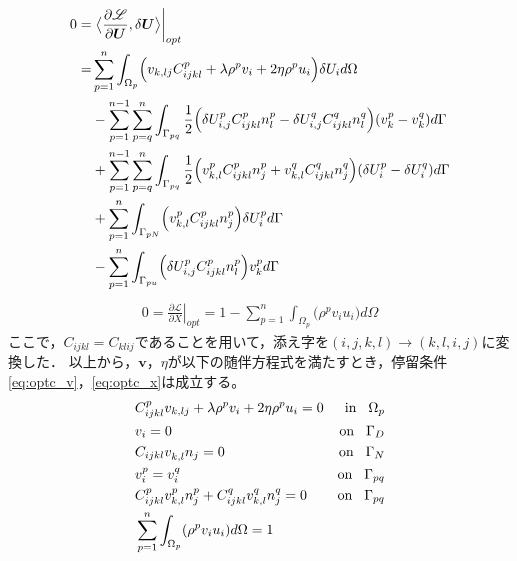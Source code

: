 \begin{align}
	0=&\left.\bigr\langle \frac{\partial \mathscr{L}}{\partial \bm{U}},\delta \bm{U} \bigl\rangle\right|_{opt}
	\nonumber
	\\
	=&\sum_{p=1}^{n}\int_{\Omega_p}\Bigr(v_{k,lj}C_{ijkl}^{p}+\lambda\rho^{p}v_{i}+2\eta\rho^{p}u_{i}\Bigl)\delta U_{i} d\Omega
	\nonumber
	\\
	&-\sum_{p=1}^{n-1}\sum_{p=q}^{n}\int_{\Gamma_{pq}}\frac{1}{2}\Bigr(\delta U_{i,j}^{p}C_{ijkl}^{p}n_{l}^{p}-\delta U_{i,j}^{q}C_{ijkl}^{q}n_{l}^{q}\Bigl)(v_{k}^{p}-v_{k}^{q}) d\Gamma
	\nonumber
	\\
	&+\sum_{p=1}^{n-1}\sum_{p=q}^{n}\int_{\Gamma_{pq}}\frac{1}{2}\Bigr(v_{k,l}^{p}C_{ijkl}^{p}n_{j}^{p}+v_{k,l}^{q}C_{ijkl}^{q}n_{j}^{q}\Bigl)(\delta U_{i}^{p}-\delta U_{i}^{q})d\Gamma
	\nonumber
	\\
	&+\sum_{p=1}^{n}\int_{\Gamma_{pN}}\Bigr(v_{k,l}^{p}C_{ijkl}^{p}n_{j}^{p}\Bigl)\delta U_{i}^{p} d\Gamma
	\nonumber
	\\
	&-\sum_{p=1}^{n}\int_{\Gamma_{pu}}\Bigr(\delta U_{i,j}^{p}C_{ijkl}^{p}n_{l}^{p}\Bigl)v_{k}^{p} d\Gamma
	\label{eq:lagrange_vderivative}
\end{align}
\begin{align}
	0=\left.\frac{\partial\mathscr{L}}{\partial X}\right|_{opt}
	=1-\sum_{p=1}^{n}\int_{\Omega_p}\bigr(\rho^{p}v_{i}u_{i}\bigl) d\Omega
	\label{eq:lagrange_xderivative}
\end{align}
ここで，$C_{ijkl}=C_{klij}$であることを用いて，添え字を$(i,j,k,l)\rightarrow(k,l,i,j)$に変換した．
以上から，$\bm{v}$，$\eta$が以下の随伴方程式を満たすとき，停留条件\eqref{eq:optc_v}，\eqref{eq:optc_x}は成立する。
\begin{align}
	&C_{ijkl}^{p}v_{k,lj}+\lambda\rho^{p}v_{i}+2\eta\rho^{p} u_{i}=0&\text{in}\hspace{0.3cm}\Omega_{p}
	\label{eq:adjmain}
	\\
	&v_{i}=0 &\text{on}\hspace{0.3cm}\Gamma_{D}
	\\
	&C_{ijkl}v_{k,l}^{}n_{j}=0 &\text{on}\hspace{0.3cm}\Gamma_{N}
	\\
	&v_{i}^{p}=v_{i}^{q} &\text{on}\hspace{0.3cm}\Gamma_{pq}
	\\
	&C_{ijkl}^{p}v_{k,l}^{p}n_{j}^{p}+C_{ijkl}^{q}v_{k,l}^{q}n_{j}^{q}=0 &\text{on}\hspace{0.3cm}\Gamma_{pq}
	\label{eq:adjbc}
	\\
	&\sum_{p=1}^{n}\int_{\Omega_p}(\rho^{p}v_{i}u_{i}) d\Omega=1
	\label{eq:adjnorm}
\end{align}
